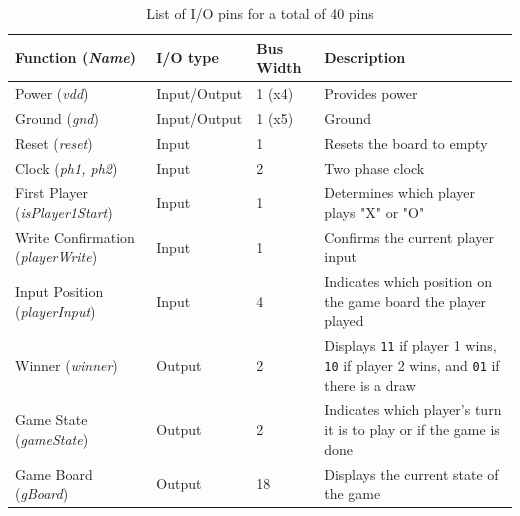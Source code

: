 \documentclass[]{article}
\begin{document}
\begin{table}
\centering
\caption{List of I/O pins for a total of 40 pins}
\begin{tabular}{ | l | l | l | p{5cm} |}
\hline
    Function (\emph{Name})                  & I/O type     & Bus Width & Description \\
\hline
    Power (\emph {vdd})                     & Input/Output & 1 (x4)    & Provides power \\
\hline
    Ground (\emph{gnd})                     & Input/Output & 1 (x5)    & Ground \\
\hline
    Reset (\emph{reset})                    & Input        & 1         & Resets the board to empty \\
\hline 
    Clock (\emph{ph1, ph2})                 & Input        & 2         & Two phase clock\\
\hline
    First Player (\emph{isPlayer1Start})    & Input        & 1         & Determines which player plays "X" or "O" \\
\hline
    Write Confirmation (\emph{playerWrite}) & Input        & 1         & Confirms the current player input \\
\hline
    Input Position (\emph{playerInput})     & Input        & 4         & Indicates which position on the game board the player played \\
\hline
    Winner (\emph{winner})                  & Output       & 2         & Displays \texttt{11} if player 1 wins, \texttt{10} if player 2 wins, and \texttt{01} if there is a draw \\
\hline
    Game State (\emph{gameState})           & Output       & 2         & Indicates which player's turn it is to play or if the game is done\\
\hline
    Game Board (\emph{gBoard})              & Output       & 18        & Displays the current state of the game \\
    \hline
\end{tabular}
\label{tab:io-list}
\end{table}


\end{document}
